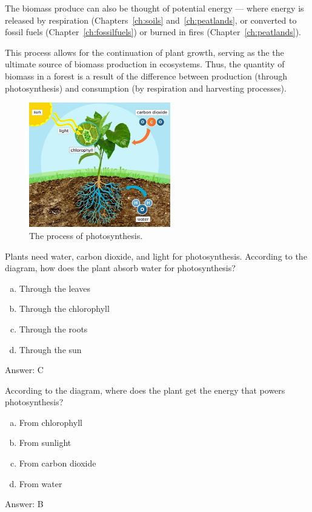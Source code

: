     
The biomass produce can also be thought of potential energy --- where energy is released by respiration (Chapters~\ref{ch:soils} and~\ref{ch:peatlands}, or converted to fossil fuels (Chapter~\ref{ch:fossilfuels}) or burned in fires (Chapter~\ref{ch:peatlands}). 

This process allows for the continuation of plant growth, serving as the the ultimate source of biomass production in ecosystems. Thus, the quantity of biomass in a forest is a result of the difference between production (through photosynthesis) and consumption (by respiration and harvesting processes).

  \begin{figure}[ht]
    \centering
        \includegraphics[width = 0.55\textwidth]{graphics/photosynthesis.jpg}
        \caption{The process of photosynthesis.}
    \end{figure}
    

\begin{problem}
  Plants need water, carbon dioxide, and light for photosynthesis. According to the diagram, how does the plant absorb water for photosynthesis? 
\begin{enumerate}[(a)]
    \item Through the leaves
    \item Through the chlorophyll
    \item Through the roots
    \item Through the sun
\end{enumerate}  


\end{problem}

Answer: C

\begin{problem}
According to the diagram, where does the plant get the energy that powers photosynthesis?
\begin{enumerate}[(a)]
\item From chlorophyll
\item From sunlight
\item From carbon dioxide
\item From water
\end{enumerate}  

Answer: B
\end{problem}

